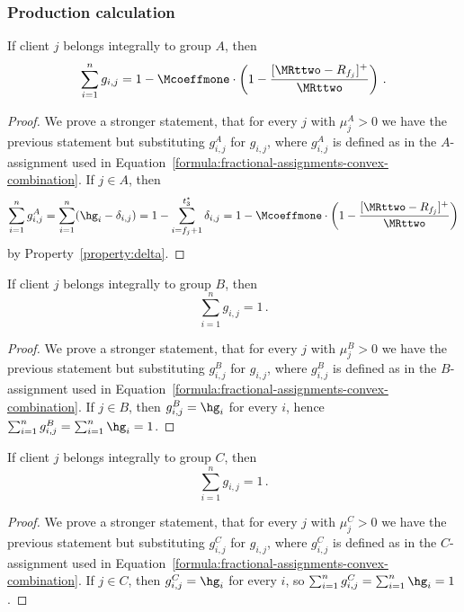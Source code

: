 \subsubsection{Production calculation}


\begin{lemma}
    \label{lem:gen-A}
    If client $j$ belongs integrally to group $A$, then
    \begin{equation*}
        \sum_{i=1}^n g_{i,j} = 1 - \Mcoeffmone \cdot \left(1 - \frac{[\MRttwo - R_{f_j}]^+}{\MRttwo}\right)\,.
    \end{equation*}
\end{lemma}
\begin{proof}
    We prove a stronger statement, that for every $j$ with $\mu_j^A > 0$ we have the previous statement but substituting $g_{i,j}^A$ for $g_{i,j}$, where $g_{i,j}^A$ is defined as in the $A$-assignment used in Equation~\ref{formula:fractional-assignments-convex-combination}. 
    If $j \in A$, then
    \begin{equation*}
        \sum_{i=1}^n g_{i,j}^A = \sum_{i=1}^n (\hg_i-\delta_{i,j}) = 1 - \sum_{i=f_j+1}^{t_3^\star} \delta_{i,j}
        = 1 - \Mcoeffmone \cdot \left(1 - \frac{[\MRttwo - R_{f_j}]^+}{\MRttwo}\right)
    \end{equation*}
    by Property~\ref{property:delta}.
\end{proof}

\begin{lemma}
    \label{lem:gen-B}
    If client $j$ belongs integrally to group $B$, then
    \begin{equation*}
        \sum_{i=1}^n g_{i,j} = 1\,.
    \end{equation*}
\end{lemma}
\begin{proof}
    We prove a stronger statement, that for every $j$ with $\mu_j^B > 0$ we have the previous statement but substituting $g_{i,j}^B$ for $g_{i,j}$, where $g_{i,j}^B$ is defined as in the $B$-assignment used in Equation~\ref{formula:fractional-assignments-convex-combination}.
    If $j \in B$, then $g_{i,j}^B=\hg_i$ for every $i$, hence $\sum_{i=1}^n g_{i,j}^B=\sum_{i=1}^n \hg_i=1$.
\end{proof}

\begin{lemma}
    \label{lem:gen-C}
    If client $j$ belongs integrally to group $C$, then
    \begin{equation*}
        \sum_{i=1}^n g_{i,j} = 1\,.
    \end{equation*}
\end{lemma}
\begin{proof}
    We prove a stronger statement, that for every $j$ with $\mu_j^C > 0$ we have the previous statement but substituting $g_{i,j}^C$ for $g_{i,j}$, where $g_{i,j}^C$ is defined as in the $C$-assignment used in Equation~\ref{formula:fractional-assignments-convex-combination}.
    If $j \in C$, then $g_{i,j}^C=\hg_i$ for every $i$, so $\sum_{i=1}^n g_{i,j}^C=\sum_{i=1}^n \hg_i=1$.
\end{proof}

